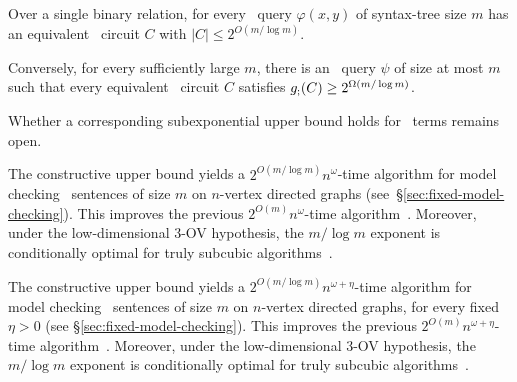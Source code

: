 \begin{theorem}
\label{thm:fixed-vocabulary}
Over a single binary relation,
for every \FOthree\ query $\varphi(x,y)$ of syntax-tree size $m$ has an equivalent \CoR\ circuit $C$ with $|C|\le 2^{O(m/\log m)}$.

Conversely, for every sufficiently large $m$, there is an \FOthree\ query $\psi$ of size at most $m$ such that every equivalent \CoR\ circuit $C$ satisfies $g_{;}(C)\ge 2^{\Omega(m/\log m)}$.


\end{theorem}

Whether a corresponding subexponential upper bound holds for \CoR\ terms remains open.

\smallskip
{}
The constructive upper bound yields a
$2^{O(m/\log m)}n^\omega$-time algorithm for model checking \FOthree\ sentences of size $m$ on $n$-vertex directed graphs (see~\S\ref{sec:fixed-model-checking}).
This improves the previous $2^{O(m)}n^\omega$-time algorithm~\citep[Theorem~10]{nakamura-uezato2027}.
Moreover, under the low-dimensional 3-OV hypothesis,
the $m/\log m$ exponent is conditionally optimal for truly subcubic algorithms~\citep[Theorem~72]{nakamura-uezato2027}.

The constructive upper bound yields a
$2^{O(m/\log m)}n^{\omega+\eta}$-time algorithm for model checking \FOthree\ sentences of size $m$ on $n$-vertex directed graphs, for every fixed $\eta>0$ (see \S\ref{sec:fixed-model-checking}).
%
This improves the previous $2^{O(m)}n^{\omega+\eta}$-time algorithm~\citep[Theorem~10]{nakamura-uezato2027}.
%
Moreover, under the low-dimensional 3-OV hypothesis, the $m/\log m$ exponent is conditionally optimal for truly subcubic algorithms~\citep[Theorem~72]{nakamura-uezato2027}.
\fi

